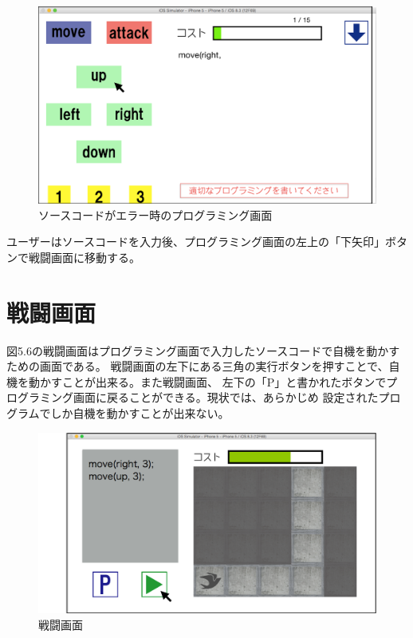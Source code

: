\documentclass[openany,11pt,papersize]{jsbook}
\begin{document}
\begin{figure}[H]
\begin{center}
\includegraphics[width=12cm, bb=0 0 1024 598]{img/4thParagraph/error.png}
\end{center}
\caption{ソースコードがエラー時のプログラミング画面}
\end{figure}
ユーザーはソースコードを入力後、プログラミング画面の左上の「下矢印」ボタンで戦闘画面に移動する。


\section{戦闘画面}
図5.6の戦闘画面はプログラミング画面で入力したソースコードで自機を動かすための画面である。
戦闘画面の左下にある三角の実行ボタンを押すことで、自機を動かすことが出来る。また戦闘画面、
左下の「P」と書かれたボタンでプログラミング画面に戻ることができる。現状では、あらかじめ
設定されたプログラムでしか自機を動かすことが出来ない。

\begin{figure}[H]
\begin{center}
\includegraphics[width=12cm, bb=0 0 1136 662]{img/4thParagraph/Prog-ra_Battle.png}
\end{center}
\caption{戦闘画面}
\end{figure}
\end{document}
